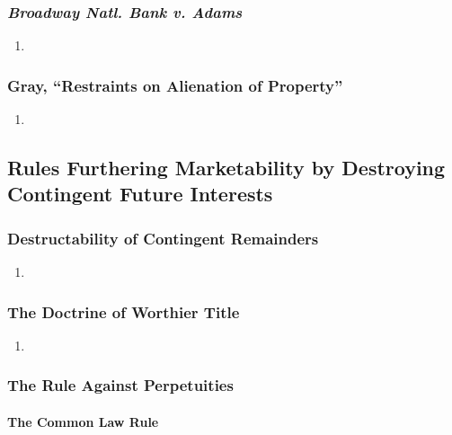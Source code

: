 \subsubsection{\emph{Broadway Natl. Bank v. Adams}}

\begin{enumerate}
    \item %
\end{enumerate}

\subsubsection{Gray, ``Restraints on Alienation of Property''}

\begin{enumerate}
    \item %
\end{enumerate}

\subsection{Rules Furthering Marketability by Destroying Contingent Future 
Interests}

\subsubsection{Destructability of Contingent Remainders}

\begin{enumerate}
    \item %
\end{enumerate}

\subsubsection{The Doctrine of Worthier Title}

\begin{enumerate}
    \item %
\end{enumerate}

\subsubsection{The Rule Against Perpetuities}

\paragraph{The Common Law Rule}

